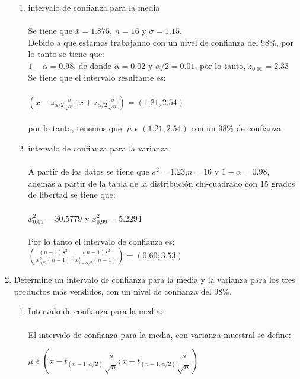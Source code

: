 \documentclass{article}
\begin{document}
\begin{enumerate}
    \begin{enumerate}{}
       
        \item{intervalo de confianza para la media}
            \paragraph{}Se tiene que $\bar{x}=1.875$, $n=16$ y $\sigma=1.15$.\\
            Debido a que estamos trabajando con un nivel de confianza del 98\%, por lo tanto se tiene que:\\ 
            $1-\alpha=0.98$, de donde $\alpha=0.02 $ y $\alpha/2=0.01$, por lo tanto, $z_{0.01}=2.33$ 
            Se tiene que el intervalo resultante es: \\\\
            $(\bar{x}-z_{\alpha/2}\frac{\sigma}{\sqrt{n}};\bar{x}+z_{\alpha/2}\frac{\sigma}{\sqrt{n}})=(1.21,2.54)$\\\\
            por lo tanto, tenemos que: $\mu$ $\epsilon$ $(1.21,2.54)$ con un 98\% de confianza
        
        \item {intervalo de confianza para la varianza}
        \paragraph{} A partir de los datos se tiene que $s^2=1.23$,$n=16$ y $1-\alpha=0.98$, ademas a partir de la tabla de la distribución chi-cuadrado con 15 grados de libertad se tiene que: \\\\
        $x_{0.01}^2=30.5779$ y $x_{0.99}^2=5.2294$ \\\\
        Por lo tanto el intervalo de confianza es: $(\frac{(n-1)s^2}{x_{\alpha/2}^2(n-1)};\frac{(n-1)s^2}{x_{1-\alpha/2}^2(n-1)})=(0.60;3.53)$ 
    \end{enumerate}
    \item Determine un intervalo de confianza para la media y la varianza para los tres productos más vendidos, con un nivel de confianza del 98\%.
    \begin{enumerate}{}
      \item{Intervalo de confianza para la media:}
			\paragraph{}El intervalo de confianza para la media, con varianza muestral se define:
      	  	\begin{center}
      	  		$\mu$ $\epsilon$ $\left(\bar{x}-t_{(n-1,\alpha/2)}\dfrac{s}{\sqrt{n}};\bar{x}+t_{(n-1,\alpha/2)}\dfrac{s}{\sqrt{n}}\right)$
			\end{center} 		     	  	 

\end{enumerate}
\end{enumerate}
\end{document}
